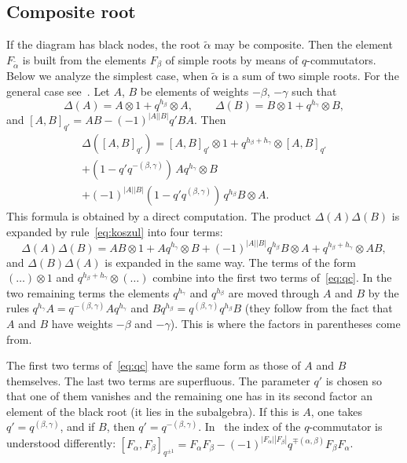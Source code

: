 \documentclass[12pt,a4paper]{article}
\newcommand{\ta}{\tilde\alpha}
\newcommand{\ot}{\otimes}
\begin{document}
\subsection{Composite root}\label{ss:comp}
If the diagram has black nodes, the root $\ta$ may be composite. Then the element $F_{\ta}$ is built from the elements $F_\beta$ of simple roots by means of $q$-commutators. Below we analyze the simplest case, when $\ta$ is a sum of two simple roots.
For the general case see~\cite[Section~5]{AMS}. Let $A$, $B$ be elements of weights $-\beta$, $-\gamma$ such that
\[
\Delta(A)=A\ot1+q^{h_\beta}\ot A,\qquad \Delta(B)=B\ot1+q^{h_\gamma}\ot B,
\]
and $[A,B]_{q'}=AB-(-1)^{|A||B|}q'BA$. Then
\begin{multline}\label{eq:qc}
\Delta([A,B]_{q'})=[A,B]_{q'}\ot1+q^{h_\beta+h_\gamma}\ot[A,B]_{q'}\\
+(1-q'q^{-(\beta,\gamma)})\,Aq^{h_\gamma}\ot B\\
+(-1)^{|A||B|}(1-q'q^{(\beta,\gamma)})\,q^{h_\beta}B\ot A .
\end{multline}
This formula is obtained by a direct computation. The product
$\Delta(A)\Delta(B)$ is expanded by rule~\eqref{eq:koszul} into four terms:
\[
\Delta(A)\Delta(B)=AB\ot1+Aq^{h_\gamma}\ot B+(-1)^{|A||B|}q^{h_\beta}B\ot A+q^{h_\beta+h_\gamma}\ot AB ,
\]
and $\Delta(B)\Delta(A)$ is expanded in the same way. The terms of the form $(\ldots)\ot1$ and $q^{h_\beta+h_\gamma}\ot(\ldots)$ combine into the first two terms of~\eqref{eq:qc}. In the two remaining terms the elements $q^{h_\gamma}$ and $q^{h_\beta}$ are moved through $A$ and $B$ by the rules $q^{h_\gamma}A=q^{-(\beta,\gamma)}Aq^{h_\gamma}$ and $Bq^{h_\beta}=q^{(\beta,\gamma)}q^{h_\beta}B$ (they follow from the fact that $A$ and $B$ have weights $-\beta$ and $-\gamma$). This is where the factors in parentheses come from.

The first two terms of~\eqref{eq:qc} have the same form as those of $A$ and $B$ themselves. The last two terms are superfluous. The parameter $q'$ is chosen so that one of them vanishes and the remaining one has in its second factor an element of the black root (it lies in the subalgebra). If this is $A$, one takes $q'=q^{(\beta,\gamma)}$, and if $B$, then $q'=q^{-(\beta,\gamma)}$. In~\cite{AMS} the index of the $q$-commutator is understood differently:
$[F_\alpha,F_\beta]_{q^{\pm1}}=F_\alpha F_\beta-(-1)^{|F_\alpha||F_\beta|}q^{\mp(\alpha,\beta)}F_\beta F_\alpha$.
\end{document}
